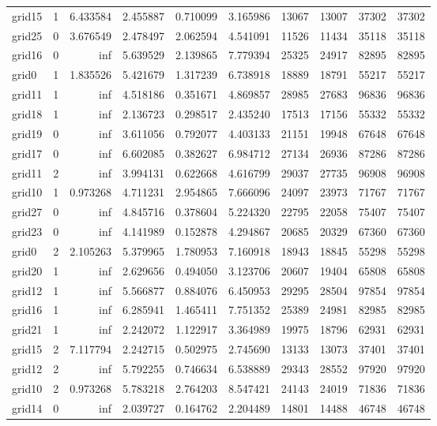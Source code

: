 \begin{longtable}{|l|r|r|r|r|r|r|r|r|r|}
grid15 & 1 & 6.433584 & 2.455887 & 0.710099 & 3.165986 & 13067 & 13007 & 37302 & 37302 \\
grid25 & 0 & 3.676549 & 2.478497 & 2.062594 & 4.541091 & 11526 & 11434 & 35118 & 35118 \\
grid16 & 0 & inf & 5.639529 & 2.139865 & 7.779394 & 25325 & 24917 & 82895 & 82895 \\
grid0 & 1 & 1.835526 & 5.421679 & 1.317239 & 6.738918 & 18889 & 18791 & 55217 & 55217 \\
grid11 & 1 & inf & 4.518186 & 0.351671 & 4.869857 & 28985 & 27683 & 96836 & 96836 \\
grid18 & 1 & inf & 2.136723 & 0.298517 & 2.435240 & 17513 & 17156 & 55332 & 55332 \\
grid19 & 0 & inf & 3.611056 & 0.792077 & 4.403133 & 21151 & 19948 & 67648 & 67648 \\
grid17 & 0 & inf & 6.602085 & 0.382627 & 6.984712 & 27134 & 26936 & 87286 & 87286 \\
grid11 & 2 & inf & 3.994131 & 0.622668 & 4.616799 & 29037 & 27735 & 96908 & 96908 \\
grid10 & 1 & 0.973268 & 4.711231 & 2.954865 & 7.666096 & 24097 & 23973 & 71767 & 71767 \\
grid27 & 0 & inf & 4.845716 & 0.378604 & 5.224320 & 22795 & 22058 & 75407 & 75407 \\
grid23 & 0 & inf & 4.141989 & 0.152878 & 4.294867 & 20685 & 20329 & 67360 & 67360 \\
grid0 & 2 & 2.105263 & 5.379965 & 1.780953 & 7.160918 & 18943 & 18845 & 55298 & 55298 \\
grid20 & 1 & inf & 2.629656 & 0.494050 & 3.123706 & 20607 & 19404 & 65808 & 65808 \\
grid12 & 1 & inf & 5.566877 & 0.884076 & 6.450953 & 29295 & 28504 & 97854 & 97854 \\
grid16 & 1 & inf & 6.285941 & 1.465411 & 7.751352 & 25389 & 24981 & 82985 & 82985 \\
grid21 & 1 & inf & 2.242072 & 1.122917 & 3.364989 & 19975 & 18796 & 62931 & 62931 \\
grid15 & 2 & 7.117794 & 2.242715 & 0.502975 & 2.745690 & 13133 & 13073 & 37401 & 37401 \\
grid12 & 2 & inf & 5.792255 & 0.746634 & 6.538889 & 29343 & 28552 & 97920 & 97920 \\
grid10 & 2 & 0.973268 & 5.783218 & 2.764203 & 8.547421 & 24143 & 24019 & 71836 & 71836 \\
grid14 & 0 & inf & 2.039727 & 0.164762 & 2.204489 & 14801 & 14488 & 46748 & 46748 \\

\end{longtable}
